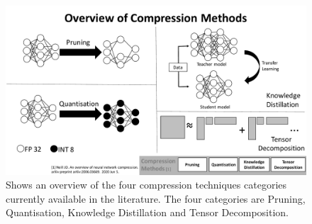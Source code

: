 \begin{figure}
    \centering
    \includegraphics[width=1\textwidth]{other/figures/compression_methodsv2.pdf}{}
    \caption{Shows an overview of the four compression techniques categories currently available in the literature. The four categories are Pruning, Quantisation, Knowledge Distillation and Tensor Decomposition.}
    \label{fig:compression_methods}
\end{figure}
















